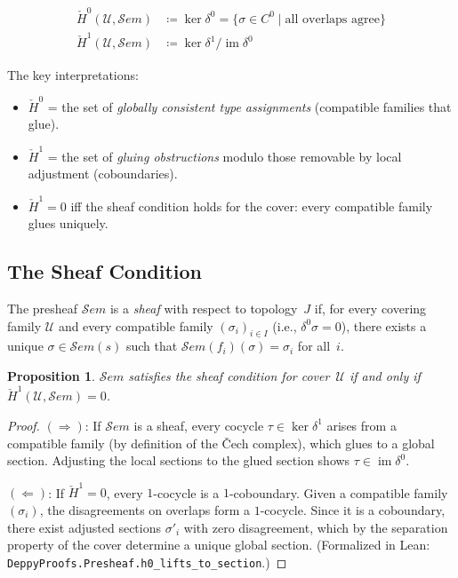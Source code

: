 \documentclass[acmsmall,screen,review,anonymous]{acmart}
\newtheorem{proposition}[theorem]{Proposition}
\theoremstyle{remark}
\newcommand{\Sem}{\mathcal{S}\mathit{em}}
\newcommand{\Hc}[1]{\check{H}^{#1}}
\newcommand{\im}{\operatorname{im}}
\newcommand{\defeq}{\coloneqq}
\begin{document}
\begin{definition}\label{def:cech-groups}
\begin{align*}
  \Hc{0}(\mathcal{U}, \Sem) &\defeq \ker \delta^0
    = \{ \sigma \in C^0 \mid \text{all overlaps agree} \} \\
  \Hc{1}(\mathcal{U}, \Sem) &\defeq \ker \delta^1 / \im \delta^0
\end{align*}
\end{definition}

The key interpretations:
\begin{itemize}[nosep]
  \item $\Hc{0}$ = the set of \emph{globally consistent type
    assignments} (compatible families that glue).
  \item $\Hc{1}$ = the set of \emph{gluing obstructions} modulo
    those removable by local adjustment (coboundaries).
  \item $\Hc{1} = 0$ iff the sheaf condition holds for the cover:
    every compatible family glues uniquely.
\end{itemize}

\subsection{The Sheaf Condition}\label{sec:sheaf-condition}

\begin{definition}\label{def:sheaf}
The presheaf $\Sem$ is a \emph{sheaf} with respect to
topology~$J$ if, for every covering family $\mathcal{U}$ and every
compatible family $(\sigma_i)_{i \in I}$ (i.e., $\delta^0 \sigma = 0$),
there exists a unique $\sigma \in \Sem(s)$ such that
$\Sem(f_i)(\sigma) = \sigma_i$ for all~$i$.
\end{definition}

\begin{proposition}\label{prop:sheaf-iff-h1}
$\Sem$ satisfies the sheaf condition for cover~$\mathcal{U}$ if and
only if $\Hc{1}(\mathcal{U}, \Sem) = 0$.
\end{proposition}

\begin{proof}
$(\Rightarrow)$: If $\Sem$ is a sheaf, every cocycle $\tau \in
\ker\delta^1$ arises from a compatible family (by definition of the
\v{C}ech complex), which glues to a global section.  Adjusting the
local sections to the glued section shows $\tau \in \im\delta^0$.

$(\Leftarrow)$: If $\Hc{1} = 0$, every $1$-cocycle is a
$1$-coboundary.  Given a compatible family $(\sigma_i)$, the
disagreements on overlaps form a $1$-cocycle.  Since it is a
coboundary, there exist adjusted sections $\sigma'_i$ with zero
disagreement, which by the separation property of the cover determine
a unique global section.  (Formalized in Lean: \texttt{DeppyProofs.Presheaf.h0\_lifts\_to\_section}.)
\end{proof}
\end{document}
